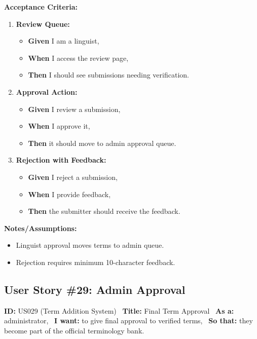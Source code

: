 \documentclass[12pt]{article}
\begin{document}
\vspace{1em}
\textbf{Acceptance Criteria:}
\begin{enumerate}
\item \textbf{Review Queue:}
\begin{itemize}
\item \textbf{Given} I am a linguist,
\item \textbf{When} I access the review page,
\item \textbf{Then} I should see submissions needing verification.
\end{itemize}

\item \textbf{Approval Action:}
\begin{itemize}
    \item \textbf{Given} I review a submission,
    \item \textbf{When} I approve it,
    \item \textbf{Then} it should move to admin approval queue.
\end{itemize}

\item \textbf{Rejection with Feedback:}
\begin{itemize}
    \item \textbf{Given} I reject a submission,
    \item \textbf{When} I provide feedback,
    \item \textbf{Then} the submitter should receive the feedback.
\end{itemize}
\end{enumerate}

\vspace{1em}
\textbf{Notes/Assumptions:}
\begin{itemize}
\item Linguist approval moves terms to admin queue.
\item Rejection requires minimum 10-character feedback.
\end{itemize}

\subsection{User Story \#29: Admin Approval}
\textbf{ID:} US029 (Term Addition System) \
\textbf{Title:} Final Term Approval \
\textbf{As a:} administrator, \
\textbf{I want:} to give final approval to verified terms, \
\textbf{So that:} they become part of the official terminology bank.
\end{document}
